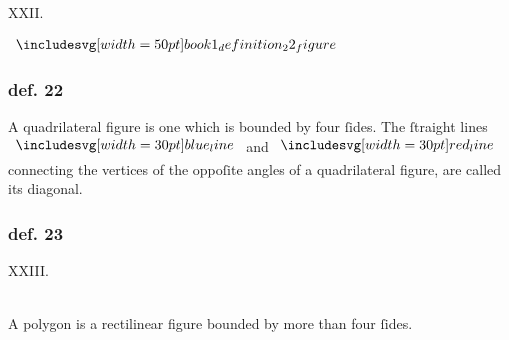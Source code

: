 \hfill

\begin{center}
    XXII.\label{book1def22}\\
\end{center}
\begin{minipage}{0.33\textwidth}
    \begin{center}
        $\img[0][0][50]{book1_definition_22_figure}$
    \end{center}
\end{minipage}%
\begin{minipage}{0.67\textwidth}
    \subsubsection{def. 22}
    \begin{center}
        \raggedright A quadrilateral figure is one which is bounded by four ſides. The ſtraight lines $\blueline$ and $\redline$ connecting the vertices of the oppoſite angles of a quadrilateral figure, are called its diagonal.
    \end{center}
\end{minipage}

\hfill

\begin{minipage}{0.1\textwidth}
    \phantom{}
\end{minipage}%
\begin{minipage}{0.8\textwidth}
    \subsubsection{def. 23}
    \begin{center}
        XXIII.\label{book1def23}\\
        \hfill\\
        \raggedright A polygon is a rectilinear figure bounded by more than four ſides.\\
    \end{center}
\end{minipage}%
\begin{minipage}{0.1\textwidth}
    \phantom{}
\end{minipage}%

\hfill


